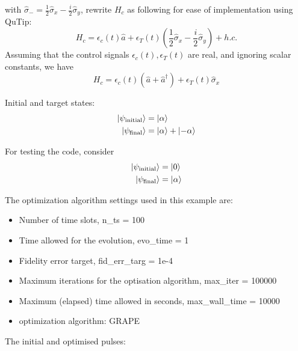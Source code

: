 \documentclass[12pt]{article}
\begin{document}
with $\hat{\sigma}_- = \frac{1}{2} \hat{\sigma}_x - \frac{i}{2}\hat{\sigma}_y$, 
rewrite $H_c$ as following for ease of implementation using QuTip:
\begin{equation}
    H_c = \epsilon_c(t) \hat{a} + \epsilon_T(t) (\frac{1}{2} \hat{\sigma}_x - \frac{i}{2}\hat{\sigma}_y) + h.c.
\end{equation}
Assuming that the control signals $\epsilon_c(t), \epsilon_T(t)$ are real, and ignoring scalar constants, we have 
$$
H_c = \epsilon_c(t) (\hat{a}+\hat{a}^{\dagger}) + \epsilon_T(t) \hat{\sigma}_x
$$

Initial and target states: 
\begin{equation}
    \begin{aligned}
    \ket{\psi_{\text{initial}}} &= \ket{\alpha} \\
    \ket{\psi_{\text{final}}} &= \ket{\alpha} + \ket{-\alpha}
\end{aligned}
\end{equation}


For testing the code, consider
\begin{equation}
    \begin{aligned}
        \ket{\psi_{\text{initial}}} &= \ket{0} \\
        \ket{\psi_{\text{final}}} &= \ket{\alpha}
    \end{aligned}
\end{equation}


The optimization algorithm settings used in this example are: 
\begin{itemize}
    \item Number of time slots, n\_ts = 100
    \item Time allowed for the evolution, evo\_time = 1
    \item Fidelity error target, fid\_err\_targ = 1e-4
    \item Maximum iterations for the optisation algorithm, max\_iter = 100000
    \item Maximum (elapsed) time allowed in seconds, max\_wall\_time = 10000
    \item optimization algorithm: GRAPE
\end{itemize}

The initial and optimised pulses:
\end{document}

